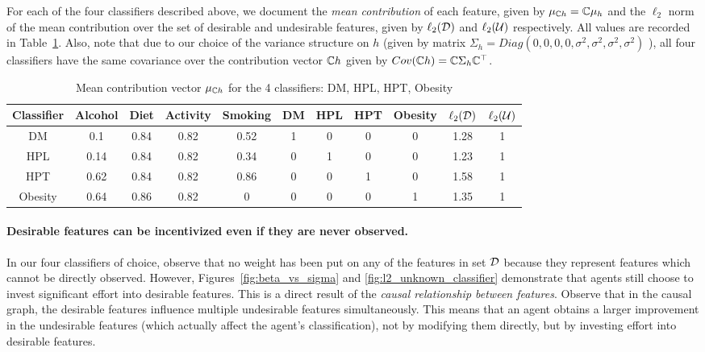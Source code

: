 For each of the four classifiers described above, we document the \textit{mean contribution} of each feature, given by $\mu_{\mathbb{C} h} = \mathbb{C} \mu_h$ and the $\ell_2$ norm of the mean contribution over the set of desirable and undesirable features, given by $\ell_2(\mathcal{D})$ and $\ell_2(\mathcal{U})$ respectively. All values are recorded in Table~\ref{table:mu}. Also, note that due to our choice of the variance structure on $h$ (given by matrix $\Sigma_h = Diag(0,0,0,0,\sigma^2, \sigma^2, \sigma^2, \sigma^2)$ ), all four classifiers have the same covariance over the contribution vector $\mathbb{C} h$ given by $Cov(\mathbb{C} h) = \mathbb{C} \Sigma_h \mathbb{C}^{\top}$.\\

\begin{table}[t!]
\centering
\begin{tabular}{|c|| c|c|c|c || c|c|c|c||c|c|}
\hline 
Classifier & Alcohol & Diet & Activity & Smoking & DM & HPL & HPT & Obesity & $\ell_2(\mathcal{D})$ & $\ell_2(\mathcal{U})$
\\
\hline 
\hline 
DM & 0.1 & 0.84 & 0.82 & 0.52 & 1 & 0 & 0 & 0 & 1.28 & 1 
\\
\hline 
HPL & 0.14 & 0.84 & 0.82 & 0.34 & 0 & 1 & 0 & 0 & 1.23 & 1 
\\
\hline 
HPT & 0.62 & 0.84 & 0.82 & 0.86 & 0 & 0 & 1 & 0 & 1.58 & 1 
\\
\hline 
Obesity & 0.64 & 0.86 & 0.82 & 0 & 0 & 0 & 0 & 1 & 1.35 & 1 
\\
\hline
\end{tabular}
\caption{Mean contribution vector $\mu_{\mathbb{C} h}$ for the 4 classifiers: DM, HPL, HPT, Obesity}\label{table:mu}
\end{table}

\paragraph{Desirable features can be incentivized even if they are never observed.} In our four classifiers of choice, observe that no weight has been put on any of the features in set $\mathcal{D}$ because they represent features which cannot be directly observed. However, Figures~\ref{fig:beta_vs_sigma} and \ref{fig:l2_unknown_classifier}  demonstrate that agents still choose to invest significant effort into desirable features. This is a direct result of the \emph{causal relationship between features}. Observe that in the causal graph, the desirable features influence multiple undesirable features simultaneously. This means that an agent obtains a larger improvement in the undesirable features (which actually affect the agent's classification), not by modifying them directly, but by investing effort into desirable features.
 

